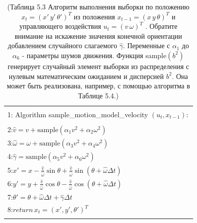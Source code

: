 \documentclass[10pt,a4paper]{article}
\begin{document}
\begin{table}[H]
\begin{center}
\begin{tabular}{|l|}
\hline
{}\\
1: \hspace{3mm} Algorithm sample\_motion\_model\_velocity $(u_t,x_{t-1}):$ \\
{}\\
2:\hspace{7mm}$\hat{v}=v+\text{sample}(\alpha_1v^2+\alpha_2\omega^2)$\\
3:\hspace{7mm}$\hat{\omega}=\omega+\text{sample}(\alpha_3v^2+\alpha_4\omega^2)$\\
4:\hspace{7mm}$\hat{\gamma}=\text{sample}(\alpha_5v^2+\alpha_6\omega^2)$\\
5:\hspace{7mm}$x'=x-\frac{\hat{v}}{\hat{\omega}}\sin\theta+\frac{\hat{v}}{\hat{\omega}}\sin(\theta+\hat{\omega}\varDelta t)$\\
6:\hspace{7mm}$y'=y+\frac{\hat{v}}{\hat{\omega}}\cos\theta-\frac{\hat{v}}{\hat{\omega}}\cos(\theta+\hat{\omega}\varDelta t)$\\
7:\hspace{7mm}$\theta'=\theta+\hat{\omega}\varDelta t+\hat{\gamma}\varDelta t$\\
8:\hspace{7mm}$\textit{return}\,x_t=(x',y',\theta')^T$\\ 
{}\\
\hline
\end{tabular}
\caption{(Таблица 5.3 Алгоритм выполнения выборки по положению $x_t = (x'\,y'\,\theta')^T$ из положения $x_{t-1} =
(x\,y\,\theta)^T$ и управляющего воздействия $u_t = (v\,\omega)^T$ . Обратите внимание на искажение значения конечной ориентации добавлением случайного слагаемого $\hat{\gamma}$. Переменные с $\alpha_1$ до $\alpha_6$  - параметры шумов движения. Функция sample$(b^2)$ генерирует случайный элемент выборки из распределения с нулевым математическим ожиданием и дисперсией $b^2$. Она может быть реализована, например, с помощью алгоритма в Таблице 5.4.)}
\end{center}
\end{table}
\end{document}
